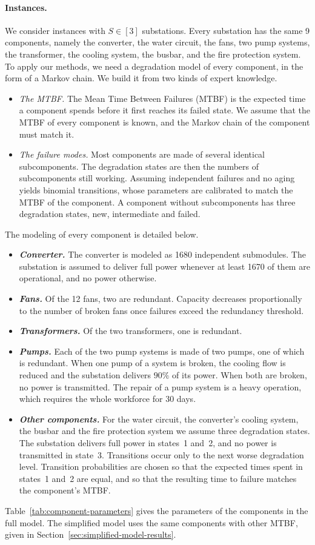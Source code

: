 \documentclass{article}
\begin{document}
\paragraph{Instances.} We consider instances with $S \in [3]$ substations. Every substation has the same 9 components,
namely the converter, the water circuit, the fans, two pump systems, the transformer, the cooling system, the busbar,
and the fire protection system. To
apply our methods, we need a degradation model of every component, in the form of a Markov chain. We build it from
two kinds of expert knowledge.
\begin{itemize}
\item \emph{The MTBF.} The Mean Time Between Failures (MTBF) is the expected time a component spends before it first
reaches its failed state. We assume that the MTBF of every component is known, and the Markov chain of the component
must match it.
\item \emph{The failure modes.} Most components are made of several identical subcomponents. The degradation states
are then the numbers of subcomponents still working. Assuming independent failures and no aging yields binomial
transitions, whose parameters are calibrated to match the MTBF of the component. A component without subcomponents
has three degradation states, new, intermediate and failed.
\end{itemize}
The modeling of every component is detailed below.
\begin{itemize}
\item \textit{\textbf{Converter.}} The converter is modeled as 1680 independent submodules. The substation is
assumed to deliver full power whenever at least 1670 of them are operational, and no power otherwise.
\item \textit{\textbf{Fans.}} Of the 12 fans, two are redundant. Capacity decreases
proportionally to the number of broken fans once failures exceed the redundancy threshold.
\item \textit{\textbf{Transformers.}} Of the two transformers, one is redundant.
\item \textit{\textbf{Pumps.}} Each of the two pump systems is made of two pumps, one of which is redundant. When one
pump of a system is broken, the cooling flow is reduced and the substation delivers $90\%$ of its power. When both are
broken, no power is transmitted. The repair of a pump system is a heavy operation, which requires the whole workforce
for 30 days.
\item \textit{\textbf{Other components.}} For the water circuit, the converter's cooling system, the busbar and the
fire protection system we assume three degradation states. The substation delivers full power in states~1 and~2, and no power is
transmitted in state~3. Transitions occur only to the next worse degradation level. Transition probabilities are
chosen so that the expected times spent in states~1 and~2 are equal, and so that the resulting time to failure
matches the component's MTBF.
\end{itemize}
Table~\ref{tab:component-parameters} gives the parameters of the components in the full model. The simplified model
uses the same components with other MTBF, given in Section~\ref{sec:simplified-model-results}.
\end{document}
